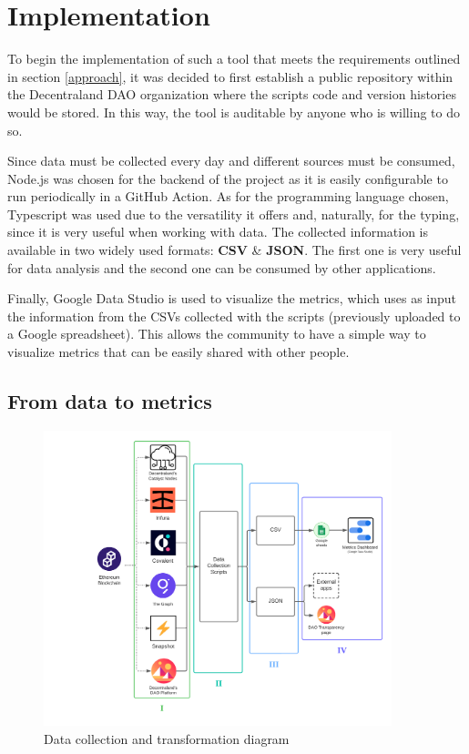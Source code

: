 \documentclass[MSE,Master,english]{twbook}%
\begin{document}
\section{Implementation}
To begin the implementation of such a tool that meets the requirements outlined in section \ref{approach}, it was decided to first establish a public repository\cite{transparencyRepo} within the Decentraland \gls{DAO} organization where the scripts code and version histories would be stored. In this way, the tool is auditable by anyone who is willing to do so.

Since data must be collected every day and different sources must be consumed, Node.js was chosen for the backend of the project as it is easily configurable to run periodically in a GitHub Action\cite{ghAction}. As for the programming language chosen, Typescript was used due to the versatility it offers and, naturally, for the typing, since it is very useful when working with data. The collected information is available in two widely used formats: \textbf{CSV} \& \textbf{JSON}. The first one is very useful for data analysis and the second one can be consumed by other applications.

Finally, Google Data Studio\cite{transparencyDashboard} is used to visualize the metrics, which uses as input the information from the CSVs collected with the scripts (previously uploaded to a Google spreadsheet). This allows the community to have a simple way to visualize metrics that can be easily shared with other people.

\subsection{From data to metrics}
\begin{figure}[H]
  \centering
  \includegraphics[width=0.9\textwidth]{diagram.png}
  \caption{Data collection and transformation diagram}
  \label{fig:diagram}
\end{figure}
\end{document}
